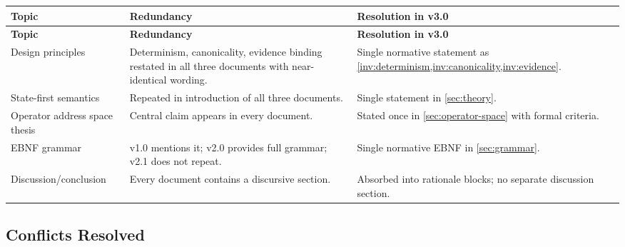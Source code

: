 \documentclass[11pt,a4paper,twoside]{article}
\theoremstyle{definition}
\theoremstyle{remark}
\begin{document}
\begin{longtable}{p{3.5cm}p{4.5cm}p{5.5cm}}
\toprule
\textbf{Topic} & \textbf{Redundancy} & \textbf{Resolution in v3.0} \\
\midrule
\endfirsthead
\toprule
\textbf{Topic} & \textbf{Redundancy} & \textbf{Resolution in v3.0} \\
\midrule
\endhead
Design principles & Determinism, canonicality, evidence binding restated in all three documents with near-identical wording. & Single normative statement as \cref{inv:determinism,inv:canonicality,inv:evidence}. \\
\addlinespace
State-first semantics & Repeated in introduction of all three documents. & Single statement in \cref{sec:theory}. \\
\addlinespace
Operator address space thesis & Central claim appears in every document. & Stated once in \cref{sec:operator-space} with formal criteria. \\
\addlinespace
EBNF grammar & v1.0 mentions it; v2.0 provides full grammar; v2.1 does not repeat. & Single normative EBNF in \cref{sec:grammar}. \\
\addlinespace
Discussion/conclusion & Every document contains a discursive section. & Absorbed into rationale blocks; no separate discussion section. \\
\bottomrule
\end{longtable}

\subsection{Conflicts Resolved}
\end{document}
